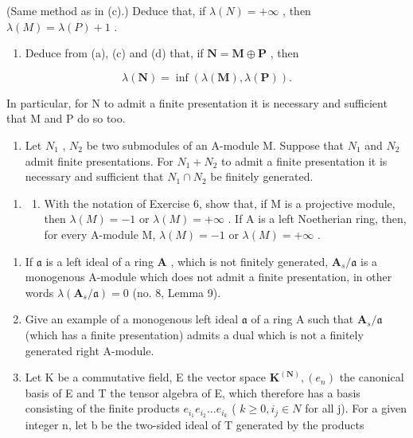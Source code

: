 (Same method as in (c).) Deduce that, if \(\lambda(N) = +\infty\) , then \(\lambda(M) = \lambda(P) + 1\) .

\begin{enumerate}
\def\labelenumi{(\alph{enumi})}
\setcounter{enumi}{4}
\tightlist
\item
  Deduce from (a), (c) and (d) that, if \(\mathbf{N} = \mathbf{M} \oplus \mathbf{P}\) , then
\end{enumerate}

\[
\lambda (\mathbf {N}) = \inf (\lambda (\mathbf {M}), \lambda (\mathbf {P})).
\]

In particular, for N to admit a finite presentation it is necessary and sufficient that M and P do so too.

\begin{enumerate}
\def\labelenumi{(\alph{enumi})}
\setcounter{enumi}{5}
\tightlist
\item
  Let \(N_{1}\) , \(N_{2}\) be two submodules of an A-module M. Suppose that \(N_{1}\) and \(N_{2}\) admit finite presentations. For \(N_{1} + N_{2}\) to admit a finite presentation it is necessary and sufficient that \(N_{1} \cap N_{2}\) be finitely generated.
\end{enumerate}

\begin{enumerate}
\def\labelenumi{\arabic{enumi}.}
\setcounter{enumi}{6}
\tightlist
\item
  \begin{enumerate}
  \def\labelenumii{(\alph{enumii})}
  \tightlist
  \item
    With the notation of Exercise 6, show that, if M is a projective module, then \(\lambda(M) = -1\) or \(\lambda(M) = +\infty\) . If A is a left Noetherian ring, then, for every A-module M, \(\lambda(M) = -1\) or \(\lambda(M) = +\infty\) .
  \end{enumerate}
\end{enumerate}

\begin{enumerate}
\def\labelenumi{(\alph{enumi})}
\setcounter{enumi}{1}
\item
  If \(\mathfrak{a}\) is a left ideal of a ring \(\mathbf{A}\) , which is not finitely generated, \(\mathbf{A}_s / \mathfrak{a}\) is a monogenous A-module which does not admit a finite presentation, in other words \(\lambda(\mathbf{A}_s / \mathfrak{a}) = 0\) (no. 8, Lemma 9).
\item
  Give an example of a monogenous left ideal \(\mathfrak{a}\) of a ring A such that \(\mathbf{A}_s / \mathfrak{a}\) (which has a finite presentation) admits a dual which is not a finitely generated right A-module.
\item
  Let K be a commutative field, E the vector space \(\mathbf{K}^{(\mathbf{N})}, (e_n)\) the canonical basis of E and T the tensor algebra of E, which therefore has a basis consisting of the finite products \(e_{i_1}e_{i_2}\ldots e_{i_k}\) ( \(k \geqslant 0, i_j \in N\) for all j). For a given integer n, let b be the two-sided ideal of T generated by the products
\end{enumerate}


